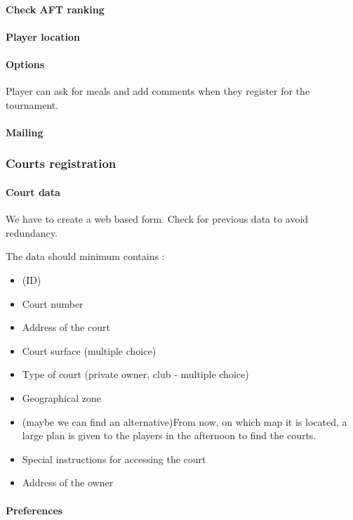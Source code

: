 \paragraph{Check AFT ranking}
\paragraph{Player location}
\paragraph{Options}

Player can ask for meals and add comments when they register for the
tournament.

\paragraph{Mailing}

\subsubsection{Courts registration}

\paragraph{Court data}

We have to create a web based form. Check for previous data to avoid
redundancy.

The data should minimum contains :

\begin{itemize}
    \item (ID)
    \item Court number
    \item Address of the court
    \item Court surface (multiple choice)
    \item Type of court (private owner, club - multiple choice)
    \item Geographical zone
    \item (maybe we can find an alternative)From now, on which map it is
        located, a large plan is given to the players in the afternoon
        to find the courts.
    \item Special instructions for accessing the court
    \item Address of the owner
\end{itemize}

\paragraph{Preferences}
